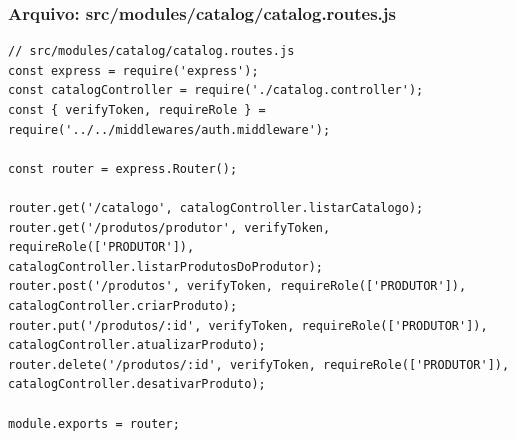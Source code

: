 \subsubsection*{Arquivo: src/modules/catalog/catalog.routes.js}
\begin{lstlisting}[caption={src/modules/catalog/catalog.routes.js}]
// src/modules/catalog/catalog.routes.js
const express = require('express');
const catalogController = require('./catalog.controller');
const { verifyToken, requireRole } = require('../../middlewares/auth.middleware');

const router = express.Router();

router.get('/catalogo', catalogController.listarCatalogo);
router.get('/produtos/produtor', verifyToken, requireRole(['PRODUTOR']), catalogController.listarProdutosDoProdutor);
router.post('/produtos', verifyToken, requireRole(['PRODUTOR']), catalogController.criarProduto);
router.put('/produtos/:id', verifyToken, requireRole(['PRODUTOR']), catalogController.atualizarProduto);
router.delete('/produtos/:id', verifyToken, requireRole(['PRODUTOR']), catalogController.desativarProduto);

module.exports = router;\end{lstlisting}
\vspace{0.5cm}
